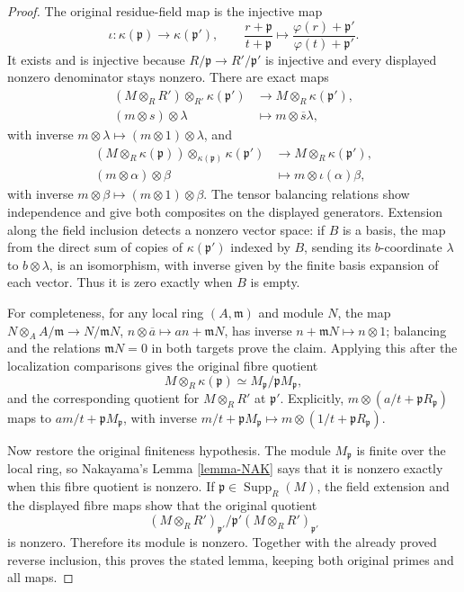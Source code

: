 \begin{proof}
The original residue-field map is the injective map
$$
\iota:\kappa(\mathfrak p)\longrightarrow\kappa(\mathfrak p'),
\qquad
\frac{r+\mathfrak p}{t+\mathfrak p}
\longmapsto
\frac{\varphi(r)+\mathfrak p'}{\varphi(t)+\mathfrak p'}.
$$
It exists and is injective because $R/\mathfrak p\to
R'/\mathfrak p'$ is injective and every displayed
nonzero denominator stays nonzero. There are exact maps
$$
\begin{split}
(M\otimes_RR')\otimes_{R'}\kappa(\mathfrak p')
&\longrightarrow M\otimes_R\kappa(\mathfrak p'),\\
(m\otimes s)\otimes\lambda
&\longmapsto m\otimes\overline s\lambda,
\end{split}
$$
with inverse $m\otimes\lambda\mapsto(m\otimes1)\otimes\lambda$,
and
$$
\begin{split}
(M\otimes_R\kappa(\mathfrak p))
\otimes_{\kappa(\mathfrak p)}\kappa(\mathfrak p')
&\longrightarrow M\otimes_R\kappa(\mathfrak p'),\\
(m\otimes\alpha)\otimes\beta
&\longmapsto m\otimes\iota(\alpha)\beta,
\end{split}
$$
with inverse $m\otimes\beta\mapsto(m\otimes1)\otimes\beta$.
The tensor balancing relations show independence and give
both composites on the displayed generators. Extension
along the field inclusion detects a nonzero vector space:
if $B$ is a basis, the map from the direct sum of copies
of $\kappa(\mathfrak p')$ indexed by $B$, sending its
$b$-coordinate $\lambda$ to $b\otimes\lambda$, is an
isomorphism, with inverse given by the finite basis
expansion of each vector. Thus it is zero exactly when
$B$ is empty.

For completeness, for any local ring $(A,\mathfrak m)$
and module $N$, the map
$N\otimes_A A/\mathfrak m\to N/\mathfrak mN$,
$n\otimes\overline a\mapsto an+\mathfrak mN$, has inverse
$n+\mathfrak mN\mapsto n\otimes1$; balancing and the
relations $\mathfrak mN=0$ in both targets prove the claim.
Applying this after the localization comparisons gives the
original fibre quotient
$$
M\otimes_R\kappa(\mathfrak p)
\simeq M_{\mathfrak p}/\mathfrak pM_{\mathfrak p},
$$
and the corresponding quotient for $M\otimes_RR'$ at
$\mathfrak p'$. Explicitly,
$m\otimes(a/t+\mathfrak pR_{\mathfrak p})$ maps to
$am/t+\mathfrak pM_{\mathfrak p}$, with inverse
$m/t+\mathfrak pM_{\mathfrak p}\mapsto
m\otimes(1/t+\mathfrak pR_{\mathfrak p})$.

Now restore the original finiteness hypothesis. The module
$M_{\mathfrak p}$ is finite over the local ring, so
Nakayama's Lemma \ref{lemma-NAK} says that it is nonzero
exactly when this fibre quotient is nonzero. If
$\mathfrak p\in\operatorname{Supp}_R(M)$, the field
extension and the displayed fibre maps show that the
original quotient
$$
(M\otimes_RR')_{\mathfrak p'}/
\mathfrak p'(M\otimes_RR')_{\mathfrak p'}
$$
is nonzero. Therefore its module is nonzero. Together
with the already proved reverse inclusion, this proves
the stated lemma, keeping both original primes and all maps.


\end{proof}
